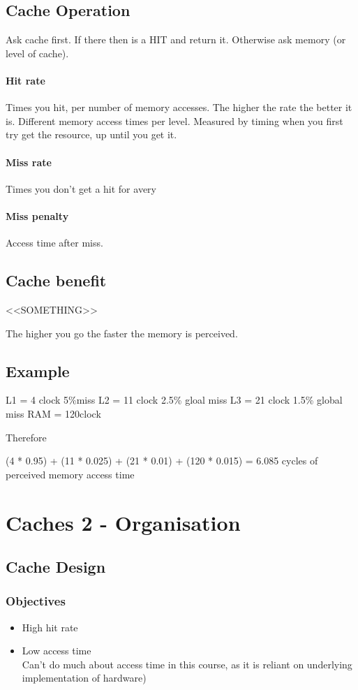 \documentclass{article}
\begin{document}
	\subsection*{Cache Operation}
		Ask cache first. If there then is a HIT and return it. Otherwise ask memory (or level of cache).

		\paragraph{Hit rate}
		Times you hit, per number of memory accesses. The higher the rate the better it is. Different memory access times per level. Measured by timing when you first try get the resource, up until you get it.

		\paragraph{Miss rate}
		Times you don't get a hit for avery 

		\paragraph{Miss penalty}
		Access time after miss.

	\subsection*{Cache benefit}
		<<SOMETHING>>

		The higher you go the faster the memory is perceived.

	\subsection*{Example}
		L1 = 4 clock	5\%miss
		L2 = 11 clock	2.5\% gloal miss
		L3 = 21 clock	1.5\% global miss
		RAM = 120clock

		Therefore

		(4 * 0.95) + (11 * 0.025) + (21 * 0.01) + (120 * 0.015) = 6.085 cycles of perceived memory access time

\section*{Caches 2 - Organisation}
	\subsection*{Cache Design}
		\subsubsection*{Objectives}
		\begin{itemize}
			\item High hit rate
			\item Low access time\\
			Can't do much about access time in this course, as it is reliant on underlying implementation of hardware)
		\end{itemize}
\end{document}
